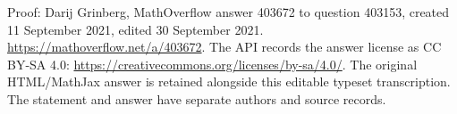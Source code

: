 \documentclass[10pt,a4paper]{article}
\begin{document}
Proof: Darij Grinberg, MathOverflow answer 403672 to question 403153,
created 11 September 2021, edited 30 September 2021.
\url{https://mathoverflow.net/a/403672}.
The API records the answer license as CC BY-SA 4.0:
\url{https://creativecommons.org/licenses/by-sa/4.0/}.
The original HTML/MathJax answer is retained alongside this editable typeset transcription.
The statement and answer have separate authors and source records.
\end{document}
